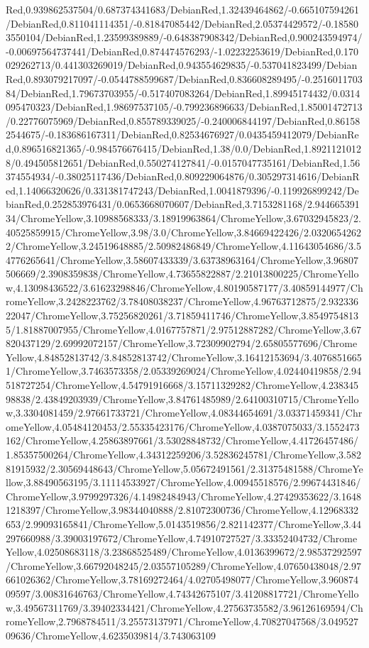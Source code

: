 {\begin{tikzternal}
Red,0.939862537504/0.687374341683/DebianRed,1.32439464862/-0.665107594261/DebianRed,0.811041114351/-0.81847085442/DebianRed,2.05374429572/-0.185803550104/DebianRed,1.23599389889/-0.648387908342/DebianRed,0.900243594974/-0.00697564737441/DebianRed,0.874474576293/-1.02232253619/DebianRed,0.170029262713/0.441303269019/DebianRed,0.943554629835/-0.537041823499/DebianRed,0.893079217097/-0.0544788599687/DebianRed,0.836608289495/-0.251601170384/DebianRed,1.79673703955/-0.517407083264/DebianRed,1.89945174432/0.0314095470323/DebianRed,1.98697537105/-0.799236896633/DebianRed,1.85001472713/0.22776075969/DebianRed,0.855789339025/-0.240006844197/DebianRed,0.861582544675/-0.183686167311/DebianRed,0.82534676927/0.0435459412079/DebianRed,0.896516821365/-0.984576676415/DebianRed,1.38/0.0/DebianRed,1.89211210128/0.494505812651/DebianRed,0.550274127841/-0.0157047735161/DebianRed,1.56374554934/-0.38025117436/DebianRed,0.809229064876/0.305297314616/DebianRed,1.14066320626/0.331381747243/DebianRed,1.0041879396/-0.119926899242/DebianRed,0.252853976431/0.0653668070607/DebianRed,3.7153281168/2.94466539134/ChromeYellow,3.10988568333/3.18919963864/ChromeYellow,3.67032945823/2.40525859915/ChromeYellow,3.98/3.0/ChromeYellow,3.84669422426/2.03206542622/ChromeYellow,3.24519648885/2.50982486849/ChromeYellow,4.11643054686/3.54776265641/ChromeYellow,3.58607433339/3.63738963164/ChromeYellow,3.96807506669/2.3908359838/ChromeYellow,4.73655822887/2.21013800225/ChromeYellow,4.13098436522/3.61623298846/ChromeYellow,4.80190587177/3.40859144977/ChromeYellow,3.2428223762/3.78408038237/ChromeYellow,4.96763712875/2.93233622047/ChromeYellow,3.75256820261/3.71859411746/ChromeYellow,3.85497548135/1.81887007955/ChromeYellow,4.0167757871/2.97512887282/ChromeYellow,3.67820437129/2.69992072157/ChromeYellow,3.72309902794/2.65805577696/ChromeYellow,4.84852813742/3.84852813742/ChromeYellow,3.16412153694/3.40768516651/ChromeYellow,3.7463573358/2.05339269024/ChromeYellow,4.02440419858/2.94518727254/ChromeYellow,4.54791916668/3.15711329282/ChromeYellow,4.23834598838/2.43849203939/ChromeYellow,3.84761485989/2.64100310715/ChromeYellow,3.3304081459/2.97661733721/ChromeYellow,4.08344654691/3.03371459341/ChromeYellow,4.05484120453/2.55335423176/ChromeYellow,4.0387075033/3.1552473162/ChromeYellow,4.25863897661/3.53028848732/ChromeYellow,4.41726457486/1.85357500264/ChromeYellow,4.34312259206/3.52836245781/ChromeYellow,3.58281915932/2.30569448643/ChromeYellow,5.05672491561/2.31375481588/ChromeYellow,3.88490563195/3.11114533927/ChromeYellow,4.00945518576/2.99674431846/ChromeYellow,3.9799297326/4.14982484943/ChromeYellow,4.27429353622/3.16481218397/ChromeYellow,3.98344040888/2.81072300736/ChromeYellow,4.12968332653/2.99093165841/ChromeYellow,5.0143519856/2.821142377/ChromeYellow,3.44297660988/3.39003197672/ChromeYellow,4.74910727527/3.33352404732/ChromeYellow,4.02508683118/3.23868525489/ChromeYellow,4.0136399672/2.98537292597/ChromeYellow,3.66792048245/2.03557105289/ChromeYellow,4.07650438048/2.97661026362/ChromeYellow,3.78169272464/4.02705498077/ChromeYellow,3.96087409597/3.00831646763/ChromeYellow,4.74342675107/3.41208817721/ChromeYellow,3.49567311769/3.39402334421/ChromeYellow,4.27563735582/3.96126169594/ChromeYellow,2.7968784511/3.25573137971/ChromeYellow,4.70827047568/3.04952709636/ChromeYellow,4.6235039814/3.743063109
\end{tikzternal}}
